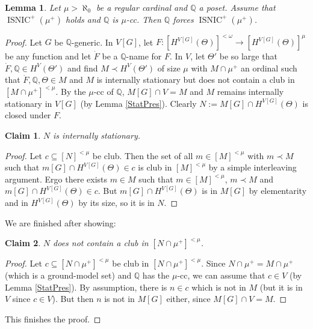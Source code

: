 \documentclass[12pt]{amsart}
\theoremstyle{definition}
\theoremstyle{remark}
\theoremstyle{plain}
\newtheorem{mylem}[mydef]{Lemma}
\newtheorem{myclaim}{Claim}
\numberwithin{mydef}{section}
\DeclareMathOperator{\ISNIC}{ISNIC}
\newcommand{\dQ}{\mathbb{Q}}
\begin{document}
	\begin{mylem}\label{PreserveUp}
		Let $\mu>\aleph_0$ be a regular cardinal and $\dQ$ a poset. Assume that $\ISNIC^+(\mu^+)$ holds and $\dQ$ is $\mu$-cc. Then $\dQ$ forces $\ISNIC^+(\mu^+)$.
	\end{mylem}
	
	\begin{proof}
		Let $G$ be $\dQ$-generic. In $V[G]$, let $F\colon[H^{V[G]}(\Theta)]^{<\omega}\to[H^{V[G]}(\Theta)]^{\mu}$ be any function and let $\dot{F}$ be a $\dQ$-name for $F$. In $V$, let $\Theta'$ be so large that $\dot{F},\dQ\in H^V(\Theta')$ and find $M\prec H^V(\Theta')$ of size $\mu$ with $M\cap\mu^+$ an ordinal such that $\dot{F},\dQ,\Theta\in M$ and $M$ is internally stationary but does not contain a club in $[M\cap\mu^+]^{<\mu}$. By the $\mu$-cc of $\dQ$, $M[G]\cap V=M$ and $M$ remains internally stationary in $V[G]$ (by Lemma \ref{StatPres}). Clearly $N:=M[G]\cap H^{V[G]}(\Theta)$ is closed under $F$.
		\setcounter{myclaim}{0}
		\begin{myclaim}
			$N$ is internally stationary.
		\end{myclaim}
		
		\begin{proof}
			Let $c\subseteq[N]^{<\mu}$ be club. Then the set of all $m\in[M]^{<\mu}$ with $m\prec M$ such that $m[G]\cap H^{V[G]}(\Theta)\in c$ is club in $[M]^{<\mu}$ by a simple interleaving argument. Ergo there exists $m\in M$ such that $m\in[M]^{<\mu}$, $m\prec M$ and $m[G]\cap H^{V[G]}(\Theta)\in c$. But $m[G]\cap H^{V[G]}(\Theta)$ is in $M[G]$ by elementarity and in $H^{V[G]}(\Theta)$ by its size, so it is in $N$.
		\end{proof}
		
		We are finished after showing:
		
		\begin{myclaim}
			$N$ does not contain a club in $[N\cap\mu^+]^{<\mu}$.
		\end{myclaim}
		
		\begin{proof}
			Let $c\subseteq[N\cap\mu^+]^{<\mu}$ be club in $[N\cap\mu^+]^{<\mu}$. Since $N\cap\mu^+=M\cap\mu^+$ (which is a ground-model set) and $\dQ$ has the $\mu$-cc, we can assume that $c\in V$ (by Lemma \ref{StatPres}). By assumption, there is $n\in c$ which is not in $M$ (but it is in $V$ since $c\in V$). But then $n$ is not in $M[G]$ either, since $M[G]\cap V=M$.
		\end{proof}
		
		This finishes the proof.
	\end{proof}
	
\end{document}
